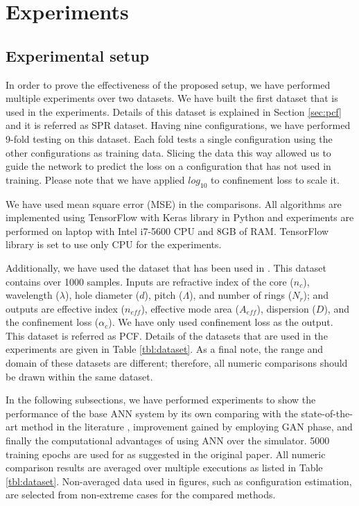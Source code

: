 \documentclass[10pt]{IEEEtran}
\begin{document}
\section{Experiments}
\label{sec:exp}

\subsection{Experimental setup}

\def\dszero{PCF}

In order to prove the effectiveness of the proposed setup, we have performed multiple experiments over two datasets. We have built the first dataset that is used in the experiments. Details of this dataset is explained in Section \ref{sec:pcf} and it is referred as SPR dataset. Having nine configurations, we have performed 9-fold testing on this dataset. Each fold tests a single configuration using the other configurations as training data. Slicing the data this way allowed us to guide the network to predict the loss on a configuration that has not used in training. Please note that we have applied $log_{10}$ to confinement loss to scale it.

We have used mean square error (MSE) in the comparisons. All algorithms are implemented using TensorFlow with Keras library in Python and experiments are performed on laptop with Intel i7-5600 CPU and 8GB of RAM. TensorFlow library is set to use only CPU for the experiments.

Additionally, we have used the dataset that has been used in \cite{paper0}. This dataset contains over 1000 samples. Inputs are refractive index of the core ($n_c$), wavelength ($\lambda$), hole diameter ($d$), pitch ($\Lambda$), and number of rings ($N_r$);  and outputs are effective index ($n_{eff}$), effective mode area ($A_{eff}$), dispersion ($D$), and the confinement loss ($\alpha_c$). We have only used confinement loss as the output. This dataset is referred as \dszero. Details of the datasets that are used in the experiments are given in Table \ref{tbl:dataset}. As a final note, the range and domain of these datasets are different; therefore, all numeric comparisons should be drawn within the same dataset.

In the following subsections, we have performed experiments to show the performance of the base ANN system by its own comparing with the state-of-the-art method in the literature \cite{paper0}, improvement gained by employing GAN phase, and finally the computational advantages of using ANN over the simulator. 5000 training epochs are used for \cite{paper0} as suggested in the original paper. All numeric comparison results are averaged over multiple executions as listed in Table \ref{tbl:dataset}. Non-averaged data used in figures, such as configuration estimation, are selected from non-extreme cases for the compared methods.
\end{document}
